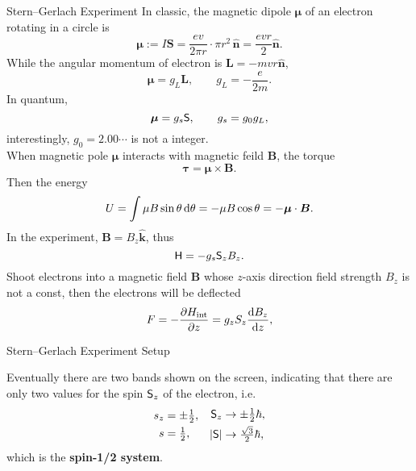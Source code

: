 \documentclass{article}
\def\d{{\rm d}}
\def\id{\,\d}%
\def\u{\uparrow}\def\v{\downarrow}
\newcommand{\ds}[2]{\frac{\d #1}{\d #2}}%
\newcommand{\pd}[2]{\frac{\partial #1}{\partial #2}}%
\newcommand{\ket}[1]{\left\vert #1\right\rangle}
\newcommand{\ibm}[1]{\,\hat{\bm #1}}%
\begin{document}
\begin{example}{Stern–Gerlach Experiment}{}
	In classic, the magnetic dipole $\bm\mu$ of an electron rotating in a circle is
	$$\bm\mu:=I\bm S=\frac{ev}{2\pi r}\cdot\pi r^2\ibm n=\frac{evr}{2}\hat{\bm n}.$$
	While the angular momentum of electron is $\bm L=-mvr\hat{\bm n}$,
	$$\bm\mu=g_L\bm L,\qquad g_L=-\frac e{2m}.$$
	In quantum,
	$$\bm\mu=g_s\mathsf S,\qquad g_s=g_0g_L,$$
	interestingly, $g_0=2.00\cdots$ is not a integer.\\
	When magnetic pole $\bm\mu$ interacts with magnetic feild $\bm B$, the torque
	$$\bm\tau=\bm\mu\times\bm B.$$
	Then the energy
	$$U=\int\mu B\sin\theta\id\theta=-\mu B\cos\theta=-\bm\mu\cdot\bm B.$$
	In the experiment, $\bm B=B_z\hat{\bm k}$, thus
	$$\mathsf H=-g_s\mathsf S_zB_z.$$
	Shoot electrons into a magnetic field $\bm B$ whose $z$-axis direction field strength $B_z$ is not a const, then the electrons will be deflected
	$$F=-\pd{H_{\rm int}}z=g_zS_z\ds{B_z}z,$$
	\begin{center}
		\usetikzlibrary{arrows.meta}
		\small Stern–Gerlach Experiment Setup
	\end{center}
	Eventually there are two bands shown on the screen, indicating that there are only two values for the spin $\mathsf S_z$ of the electron, i.e.
	\begin{align*}
		\begin{aligned}
			s_z & =\pm\textstyle\frac12, \\
			s   & =\textstyle\frac12,
		\end{aligned}\quad
		\begin{aligned}
			\mathsf S_z & \rightarrow\pm\textstyle\frac12\hbar,     \\
			|\mathsf S| & \rightarrow\textstyle\frac{\sqrt3}2\hbar,
		\end{aligned}
	\end{align*}
	which is the \textbf{spin-1/2 system}.
\end{example}
\end{document}
